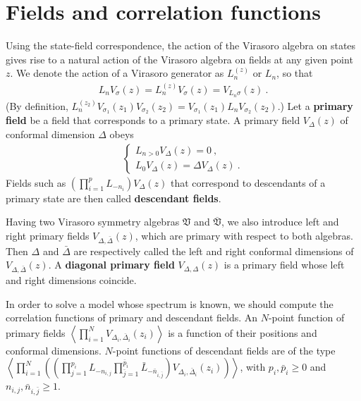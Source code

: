 \documentclass[12pt, a4paper, notitlepage, twoside]{report}
\numberwithin{equation}{section}
\theoremstyle{break}
\begin{document}
\section{Fields and correlation functions \label{secfcf}}

Using the state-field correspondence, the action of the Virasoro algebra on states gives rise to a natural action of the Virasoro algebra on fields at any given point $z$. We denote the action of a Virasoro generator as $L_n^{(z)}$ or $L_n$, so that 
\begin{align}
 L_nV_\sigma(z) = L_n^{(z)}V_\sigma(z) = V_{L_n\sigma}(z)\ .
\label{lnzv}
\end{align}
(By definition, $ L_n^{(z_2)} V_{\sigma_1}(z_1)V_{\sigma_2}(z_2) = V_{\sigma_1}(z_1) L_nV_{\sigma_2}(z_2)$.)
Let a \textbf{\boldmath primary field} be a field that corresponds to a primary state.
A primary field
$V_\Delta(z)$ of conformal dimension $\Delta$ obeys
\begin{align}
\boxed{
 \left\{\begin{array}{l}  L_{n>0} V_\Delta(z) = 0 \ , 
\\
L_0 V_\Delta(z) = \Delta V_\Delta(z) \ .
\end{array}\right. 
}
\label{ldld}
\end{align}
Fields such as  $\left(\prod_{i=1}^p L_{-n_i}\right) V_\Delta(z)$ that correspond to descendants of a primary state are then called  \textbf{descendant fields}.

Having two Virasoro symmetry algebras $\mathfrak{V}$ and $\overline{\mathfrak{V}}$, we also introduce left and right primary fields $V_{\Delta,\bar\Delta}(z)$, which are primary with respect to both algebras. Then $\Delta$ and $\bar\Delta$ are respectively called the left and right conformal dimensions of $V_{\Delta,\bar\Delta}(z)$. A \textbf{diagonal primary field} $V_{\Delta,\Delta}(z)$ is a primary field whose left and right dimensions coincide.

In order to solve a model whose spectrum is known, we should compute the correlation functions of primary and descendant fields.
An $N$-point function of primary fields $\left\langle \prod_{i=1}^N V_{\Delta_i,\bar\Delta_i}(z_i) \right\rangle$ is a function of their positions and conformal dimensions.
$N$-point functions of descendant fields are of the type $\left\langle \prod_{i=1}^N \left(\left(\prod_{j=1}^{p_i} L_{-n_{i,j}}\prod_{\bar j=1}^{\bar p_i} \bar L_{-\bar n_{i,\bar j}}\right)V_{\Delta_i,\bar\Delta_i}(z_i)\right) \right\rangle$, with $p_i,\bar p_i\geq 0$ and $n_{i,j},\bar n_{i,\bar j}\geq 1$. 
\end{document}
